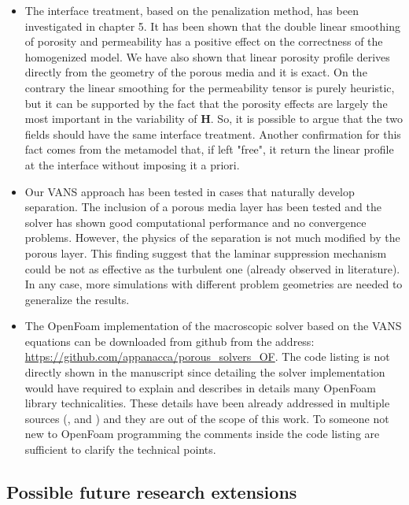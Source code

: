 \begin{itemize}
\item The interface treatment, based on the penalization method, has been investigated in chapter 5. It has been shown that the double linear smoothing of porosity and permeability has a positive effect on the correctness of the homogenized model. We have also shown that linear porosity profile derives directly from the geometry of the porous media and it is exact. On the contrary the linear smoothing for the permeability tensor is purely heuristic, but it can be supported by the fact that the porosity effects are largely the most important in the variability of $\mathbf{H}$. So, it is possible to argue that the two fields should have the same interface treatment. Another confirmation for this fact comes from the metamodel that, if left "free", it return the linear profile at the interface without imposing it a priori.
 
 \item Our VANS approach has been tested in cases that naturally develop separation. The inclusion of a porous media layer has been tested and the solver has shown good computational performance and no convergence problems. However, the physics of the separation is not much modified by the porous layer. This finding suggest that the laminar suppression mechanism could be not as effective as the turbulent one (already observed in literature). In any case, more simulations with different problem geometries are needed to generalize the results.

\item The OpenFoam implementation of the macroscopic solver based on the VANS equations can be downloaded from github from the address: \url{https://github.com/appanacca/porous_solvers_OF}.
The code listing is not directly shown in the manuscript since detailing the solver implementation would have required to explain and describes in details many OpenFoam library 
technicalities. These details have been already addressed in multiple sources (\citet{jasak1996error}, \citet{moukalled2016finite} and 
\citet{maric2014openfoam}) and they are out of the scope of this work.
To someone not new to OpenFoam programming the comments inside the code listing are sufficient to clarify the technical points.


\end{itemize}


\subsection{Possible future research extensions}

